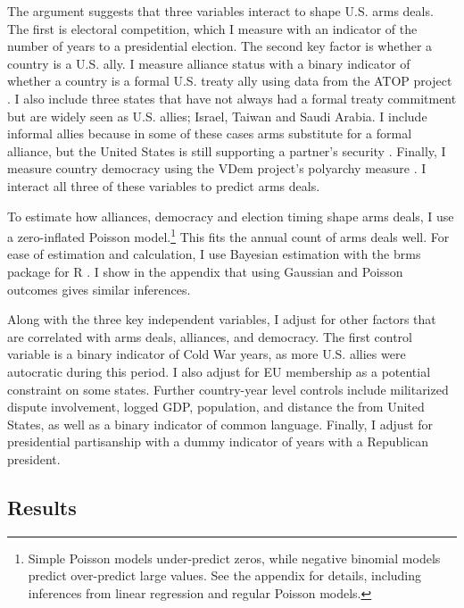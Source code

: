 \documentclass[12pt]{article}
\begin{document}
The argument suggests that three variables interact to shape U.S. arms deals. 
The first is electoral competition, which I measure with an indicator of the number of years to a presidential election. 
The second key factor is whether a country is a U.S. ally. 
I measure alliance status with a binary indicator of whether a country is a formal U.S. treaty ally using data from the ATOP project \citep{Leedsetal2002}.
I also include three states that have not always had a formal treaty commitment but are widely seen as U.S. allies; Israel, Taiwan and Saudi Arabia. 
I include informal allies because in some of these cases arms substitute for a formal alliance, but the United States is still supporting a partner's security \citep{Yarhi-Miloetal2016}. 
Finally, I measure country democracy using the VDem project's polyarchy measure \citep{Coppedgeetal2008}. 
I interact all three of these variables to predict arms deals. 


To estimate how alliances, democracy and election timing shape arms deals, I use a zero-inflated Poisson model.\footnote{Simple Poisson models under-predict zeros, while negative binomial models predict over-predict large values. See the appendix for details, including inferences from linear regression and regular Poisson models.} 
This fits the annual count of arms deals well.
For ease of estimation and calculation, I use Bayesian estimation with the brms package for \textsf{R} \citep{Buerkner2017}. 
I show in the appendix that using Gaussian and Poisson outcomes gives similar inferences. 


Along with the three key independent variables, I adjust for other factors that are correlated with arms deals, alliances, and democracy. 
The first control variable is a binary indicator of Cold War years, as more U.S. allies were autocratic during this period. 
I also adjust for EU membership as a potential constraint on some states. 
Further country-year level controls include militarized dispute involvement, logged GDP, population, and distance the from United States, as well as a binary indicator of common language. 
Finally, I adjust for presidential partisanship with a dummy indicator of years with a Republican president.  



\subsection{Results}
\end{document}
